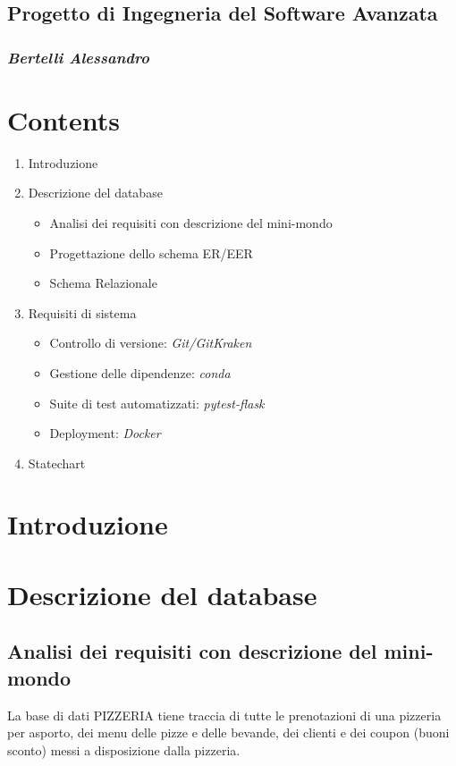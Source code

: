 \documentclass[a4paper, 12 pt]{article}
\begin{document}
	\begin{center}
		\section* {Progetto di Ingegneria del Software Avanzata}
		\subsubsection*{\textit{Bertelli Alessandro}}
	\end{center}
	\break

	\section* {Contents}
	\begin{enumerate}
		\item Introduzione
		\item Descrizione del database
		\begin{itemize}
			\item Analisi dei requisiti con descrizione del mini-mondo
			\item Progettazione dello schema ER/EER
			\item Schema Relazionale
		\end{itemize}
		\item Requisiti di sistema
		\begin{itemize}
			\item Controllo di versione: \textit{Git/GitKraken}
			\item Gestione delle dipendenze: \textit{conda}
			\item Suite di test automatizzati: \textit{pytest-flask}
			\item Deployment: \textit{Docker}
		\end{itemize}
		\item Statechart
	\end{enumerate}
	\break

	\section* {Introduzione}
	\break
	
	\section* {Descrizione del database}
		\subsection*{Analisi dei requisiti con descrizione del mini-mondo}
		La base di dati PIZZERIA tiene traccia di tutte le prenotazioni di una pizzeria per asporto,
		dei menu delle pizze e delle bevande, dei clienti e dei coupon (buoni sconto) messi a disposizione
		dalla pizzeria.
		
\end{document}
